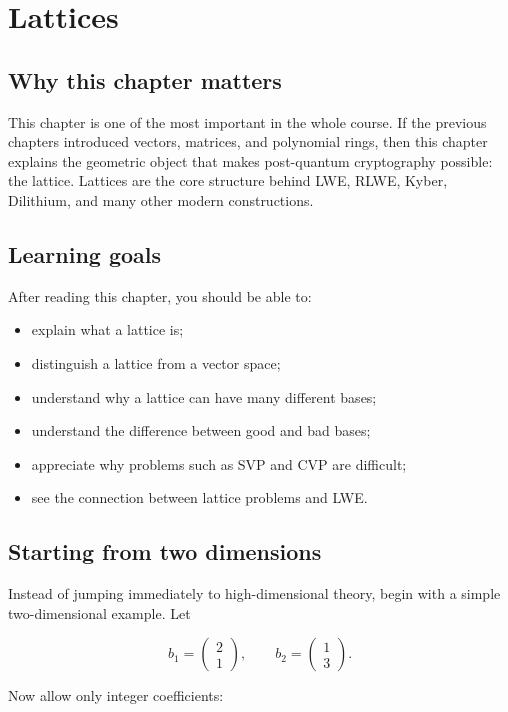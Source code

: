 \chapter{Lattices}
\label{ch:lattice}

\section{Why this chapter matters}
This chapter is one of the most important in the whole course. If the previous chapters introduced vectors, matrices, and polynomial rings, then this chapter explains the geometric object that makes post-quantum cryptography possible: the lattice. Lattices are the core structure behind LWE, RLWE, Kyber, Dilithium, and many other modern constructions.

\section{Learning goals}
After reading this chapter, you should be able to:

\begin{itemize}
  \item explain what a lattice is;
  \item distinguish a lattice from a vector space;
  \item understand why a lattice can have many different bases;
  \item understand the difference between good and bad bases;
  \item appreciate why problems such as SVP and CVP are difficult;
  \item see the connection between lattice problems and LWE.
\end{itemize}

\section{Starting from two dimensions}
Instead of jumping immediately to high-dimensional theory, begin with a simple two-dimensional example. Let

\[
b_1 = \begin{pmatrix}2\\1\end{pmatrix}, \qquad b_2 = \begin{pmatrix}1\\3\end{pmatrix}.
\]

Now allow only integer coefficients:

